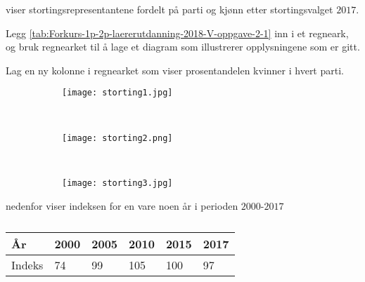  viser
stortingsrepresentantene fordelt på parti og kjønn etter stortingsvalget $2017$.

\begin{oppgaver}
   Legg \cref{tab:Forkurs-1p-2p-laererutdanning-2018-V-oppgave-2-1} inn
    i et regneark, og bruk regnearket til å lage et diagram som illustrerer
    opplysningene som er gitt.
\end{oppgaver}

\begin{oppgaver}
   Lag en ny kolonne i regnearket som viser prosentandelen kvinner i
    hvert parti.
\end{oppgaver}

\begin{figure}[H]
    \centering
    \begin{subfigure}[b]{0.31\textwidth}
      \centering
      \texttt{[image: storting1.jpg]}
    \end{subfigure}
    ~
    \begin{subfigure}[b]{0.31\textwidth}
      \centering
      \texttt{[image: storting2.png]}
    \end{subfigure}
    ~
    \begin{subfigure}[b]{0.31\textwidth}
      \centering
      \texttt{[image: storting3.jpg]}
    \end{subfigure}
\end{figure}


\Oppgave[6]

 nedenfor viser
indeksen for en vare noen år i perioden $2000$-$2017$

\begin{table}[H]
  \centering
  \caption{}
  \label{tab:Forkurs-1p-2p-laererutdanning-2018-V-oppgave-2-2}
  \begin{tabularx}{\textwidth}{|X| *{5}{Y|}}
    \hline
    \Cellcolor År     & 2000 & 2005 & 2010 & 2015 & 2017 \\
    \hline
    \Cellcolor Indeks &   74 &   99 &  105 &  100 &   97 \\
    \hline
  \end{tabularx}
\end{table}

